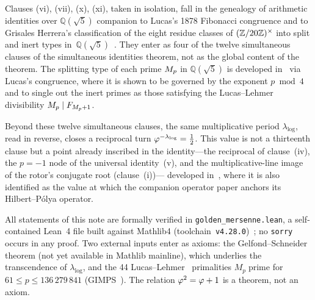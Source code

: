 Clauses (vi), (vii), (x), (xi), taken in isolation, fall in the
genealogy of arithmetic identities over
$\mathbb{Q}(\sqrt{5})$ companion to Lucas's 1878 Fibonacci
congruence and to Grisales Herrera's classification of the eight
residue classes of $(\mathbb{Z}/20\mathbb{Z})^{\times}$ into split and inert types
in~$\mathbb{Q}(\sqrt{5})$~\cite{grisales}.  They enter
 as four of the twelve simultaneous clauses
of the simultaneous identities theorem, not as the global content of the
theorem.  The splitting type of each prime $M_{p}$ in $\mathbb{Q}(\sqrt5)$ is
developed in~ via Lucas's congruence, where it is
shown to be governed by the exponent $p\bmod4$ and to single out the
inert primes as those satisfying the Lucas--Lehmer divisibility
$M_{p}\mid F_{M_{p}+1}$.

Beyond these twelve simultaneous clauses, the same multiplicative period
$\lambda_{\log}$, read in reverse, closes a reciprocal turn
$\varphi^{-\lambda_{\log}}=\tfrac12$.  This value is not a thirteenth
clause but a point already inscribed in the identity---the reciprocal of
clause~(iv), the $p=-1$ node of the universal identity~(v), and the
multiplicative-line image of the rotor's conjugate root (clause~(i))---%
developed in~, where it is also identified as the
value at which the companion operator paper anchors its Hilbert--P\'olya
operator.

All statements of this note are formally verified in
\texttt{golden\_mersenne.lean}, a self-contained Lean~4
file built against Mathlib4 (toolchain~\texttt{v4.28.0})~\cite{mathlib};
no \texttt{sorry} occurs in any proof.  Two external inputs enter as
axioms: the Gelfond--Schneider theorem (not yet available in Mathlib
mainline), which underlies the transcendence of $\lambda_{\log}$, and the
44 Lucas--Lehmer~\cite{lehmer} primalities $M_{p}\;\text{prime}$ for
$61\leq p\leq 136\,279\,841$ (GIMPS~\cite{gimps}).  The relation
$\varphi^{2}=\varphi+1$ is a theorem, not an axiom.

